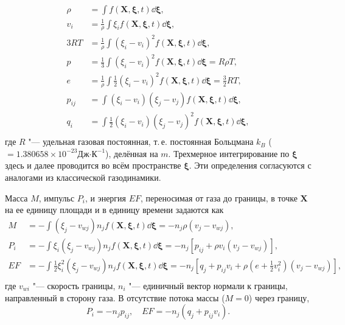 \begin{align}\label{eq:macro}
	\rho &= \int f(\boldsymbol X,\boldsymbol\xi,t)\boldsymbol{\dd\xi}, \\
	v_i &= \frac1{\rho}\int\xi_i f(\boldsymbol X,\boldsymbol\xi,t)\boldsymbol{\dd\xi}, \\
	3RT &= \frac1{\rho}\int (\xi_i-v_i)^2 f(\boldsymbol X,\boldsymbol\xi,t)\boldsymbol{\dd\xi}, \\
	p &= \frac1{3}\int (\xi_i-v_i)^2 f(\boldsymbol X,\boldsymbol\xi,t)\boldsymbol{\dd\xi} = R\rho T, \\
	e &= \frac1{\rho}\int\frac1{2} (\xi_i-v_i)^2 f(\boldsymbol X,\boldsymbol\xi,t)\boldsymbol{\dd\xi} = \frac3{2}RT, \\
	p_{ij} &= \int (\xi_i-v_i)(\xi_j-v_j) f(\boldsymbol X,\boldsymbol\xi,t)\boldsymbol{\dd\xi}, \\
	q_i &= \int\frac1{2} (\xi_i-v_i)(\xi_j-v_j)^2 f(\boldsymbol X,\boldsymbol\xi,t)\boldsymbol{\dd\xi}, \\
\end{align}
где \(R\) "--- удельная газовая постоянная, т.\,е. постоянная Больцмана \(k_B\) (\(=1.380658\times 10^{-23} \text{Дж·К}^{-1}\)), делённая на \(m\).
Трехмерное интегрирование по \(\boldsymbol\xi\) здесь и далее проводится во всём пространстве \(\boldsymbol\xi\).
Эти определения согласуются с аналогами из классической газодинамики.

Масса \(M\), импульс \(P_i\), и энергия \(EF\), переносимая от газа
до границы, в точке \(\boldsymbol X\) на ее единицу площади и в единицу времени задаются как
\begin{align}\label{eq:macro_transfer}
	M &= -\int (\xi_j-v_{wj}) n_j f(\boldsymbol X,\boldsymbol\xi,t)\boldsymbol{\dd\xi} = -n_j\rho(v_j-v_{wj}), \\
	P_i &= -\int \xi_i(\xi_j-v_{wj}) n_j f(\boldsymbol X,\boldsymbol\xi,t)\boldsymbol{\dd\xi} = -n_j\left[p_{ij}+\rho v_i(v_j-v_{wj})\right], \\
	EF &= -\int\frac1{2} \xi_i^2(\xi_j-v_{wj}) n_j f(\boldsymbol X,\boldsymbol\xi,t)\boldsymbol{\dd\xi} 
		= -n_j\left[q_j+p_{ij}v_i+\rho\left(e+\frac1{2}v_i^2\right)(v_j-v_{wj})\right], \\
\end{align}
где \(v_{wi}\) "--- скорость границы, \(n_i\) "--- единичный вектор нормали к границы, направленный в сторону газа.
В отсутствие потока массы (\(M=0\)) через границу,
\[ P_i = -n_j p_{ij}, \quad EF = -n_j (q_j+p_{ij}v_i). \]

